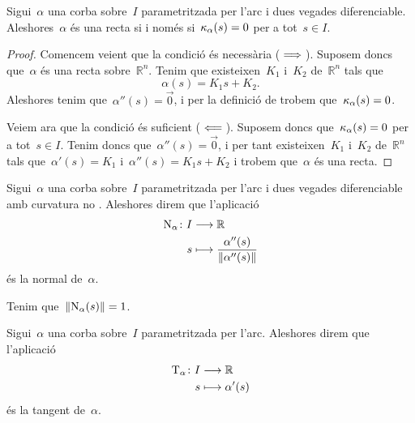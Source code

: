\documentclass[../../main.tex]{subfiles}
\begin{document}
    \begin{proposition}
        \label{prop:una corba té curvatura zero si i només si és una recta}
        Sigui~\(\alpha\) una corba sobre~\(I\) parametritzada per l'arc i dues vegades diferenciable.
        Aleshores~\(\alpha\) és una recta si i només si~\(\operatorname{\kappa}_{\alpha}(s)=0\) per a tot~\(s\in I\).
        \begin{proof}
            Comencem veient que la condició és necessària (\(\implies\)).
            Suposem doncs que~\(\alpha\) és una recta sobre~\(\mathbb{R}^{n}\).
            Tenim que existeixen~\(K_{1}\) i~\(K_{2}\) de~\(\mathbb{R}^{n}\) tals que
            \[
                \alpha(s)=K_{1}s+K_{2}.
            \]
            Aleshores tenim que~\(\alpha''(s)=\vec{0}\), i per la definició de  trobem que~\(\operatorname{\kappa}_{\alpha}(s)=0\).

            Veiem ara que la condició és suficient (\(\impliedby\)).
            Suposem doncs que~\(\operatorname{\kappa}_{\alpha}(s)=0\) per a tot~\(s\in I\).
            Tenim doncs que~\(\alpha''(s)=\vec{0}\), i per tant existeixen~\(K_{1}\) i~\(K_{2}\) de~\(\mathbb{R}^{n}\) tals que~\(\alpha'(s)=K_{1}\) i~\(\alpha''(s)=K_{1}s+K_{2}\) i trobem que~\(\alpha\) és una recta.
        \end{proof}
    \end{proposition}
    \begin{definition}[Normal]
        \label{def:normal}
        Sigui~\(\alpha\) una corba sobre~\(I\) parametritzada per l'arc i dues vegades diferenciable amb curvatura no \nulla{}.
        Aleshores direm que l'aplicació
        \begin{align*}
            \normal_{\alpha}\colon I&\longrightarrow\mathbb{R} \\
            s&\longmapsto\frac{\alpha''(s)}{\norm{\alpha''(s)}}
        \end{align*}
        és la normal de~\(\alpha\).
    \end{definition}
    \begin{observation}
        \label{obs:la normal a una corba és unitària}
        Tenim que~\(\norm{\normal_{\alpha}(s)}=1\).
    \end{observation}
    \begin{definition}[Tangent]
        \label{def:tangent}
        Sigui~\(\alpha\) una corba sobre~\(I\) parametritzada per l'arc.
        Aleshores direm que l'aplicació
        \begin{align*}
            \operatorname{T}_{\alpha}\colon I&\longrightarrow\mathbb{R} \\
            s&\longmapsto\alpha'(s)
        \end{align*}
        és la tangent de~\(\alpha\).
    \end{definition}
\end{document}
